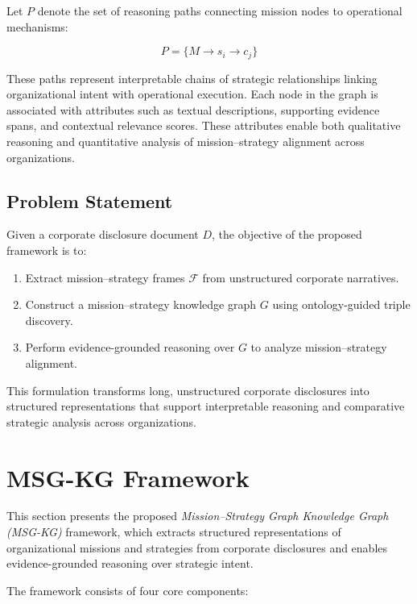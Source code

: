 \documentclass[11pt]{article}
\begin{document}
Let $P$ denote the set of reasoning paths connecting mission nodes to operational mechanisms:

\begin{equation}
P = \{ M \rightarrow s_i \rightarrow c_j \}
\end{equation}

These paths represent interpretable chains of strategic relationships linking organizational intent with operational execution. Each node in the graph is associated with attributes such as textual descriptions, supporting evidence spans, and contextual relevance scores. These attributes enable both qualitative reasoning and quantitative analysis of mission--strategy alignment across organizations.

\subsection{Problem Statement}

Given a corporate disclosure document $D$, the objective of the proposed framework is to:

\begin{enumerate}[leftmargin=1.0em, itemsep=0.05em, topsep=0.05em]
\item Extract mission--strategy frames $\mathcal{F}$ from unstructured corporate narratives.
\item Construct a mission--strategy knowledge graph $G$ using ontology-guided triple discovery.
\item Perform evidence-grounded reasoning over $G$ to analyze mission--strategy alignment.
\end{enumerate}

This formulation transforms long, unstructured corporate disclosures into structured representations that support interpretable reasoning and comparative strategic analysis across organizations.


\section{MSG-KG Framework}

This section presents the proposed \textit{Mission--Strategy Graph Knowledge Graph (MSG-KG)} framework, which extracts structured representations of organizational missions and strategies from corporate disclosures and enables evidence-grounded reasoning over strategic intent.

The framework consists of four core components:
\end{document}

